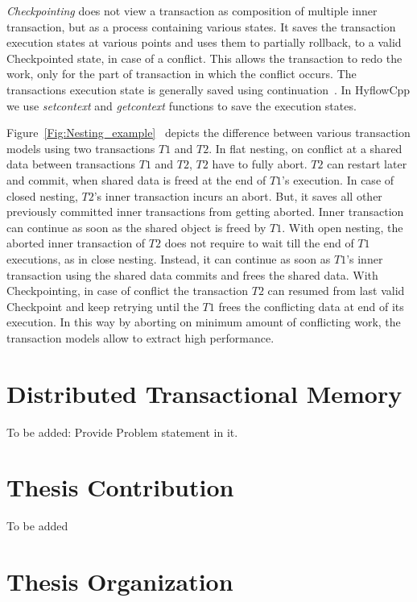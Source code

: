 \documentclass[12pt,english]{report}
\begin{document}
\textit{Checkpointing} does not view a transaction as composition of multiple inner transaction, but as a process containing various states. It saves the transaction execution states at various points and uses them to partially rollback, to a valid Checkpointed state, in case of a conflict. This allows the transaction to redo the work, only for the part of transaction in which the conflict occurs. The transactions execution state is generally saved using continuation~\cite{flanagan1993essence}. In HyflowCpp we use \textit{setcontext} and \textit{getcontext} functions to save the execution states.     

Figure~\ref{Fig:Nesting_example}~\cite{Alex:ONTFA2367601} depicts the difference between various transaction models using two transactions $T1$ and $T2$. In flat nesting, on conflict at a shared data between transactions $T1$ and $T2$, $T2$ have to fully abort. $T2$ can restart later and commit, when shared data is freed at the end of $T1$'s execution. In case of closed nesting, $T2$'s inner transaction incurs an abort. But, it saves all other previously committed inner transactions from getting aborted. Inner transaction can continue as soon as the shared object is freed by $T1$. With open nesting, the aborted inner transaction of $T2$ does not require to wait till the end of $T1$ executions, as in close nesting. Instead, it can continue as soon as $T1$'s inner transaction using the shared data commits and frees the shared data. With Checkpointing, in case of conflict the transaction $T2$ can resumed from last valid Checkpoint and keep retrying until the $T1$ frees the conflicting data at end of its execution. In this way by aborting on minimum amount of conflicting work, the transaction models allow to extract high performance. 

\section{Distributed Transactional Memory}

To be added: Provide Problem statement in it.

\section{Thesis Contribution}

To be added

\section{Thesis Organization}
\end{document}

